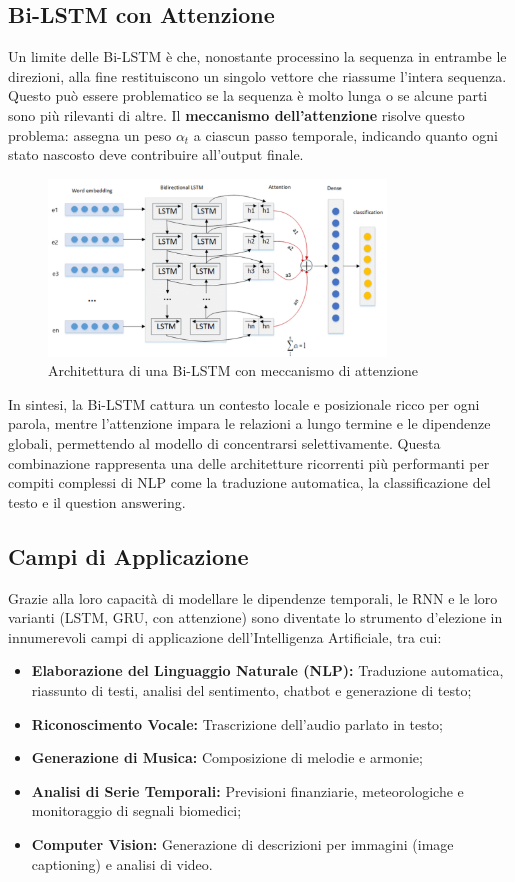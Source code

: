 \subsection{Bi-LSTM con Attenzione}
Un limite delle Bi-LSTM è che, nonostante processino la sequenza in entrambe le direzioni, alla fine restituiscono un singolo vettore che riassume l'intera sequenza. Questo può essere problematico se la sequenza è molto lunga o se alcune parti sono più rilevanti di altre. Il \textbf{meccanismo dell'attenzione} risolve questo problema: assegna un peso $\alpha_t$ a ciascun passo temporale, indicando quanto ogni stato nascosto deve contribuire all'output finale.

\begin{figure}[hbtp]
    \centering
    \includegraphics[width=0.8\textwidth]{figure/Bi-LSTMAtt.png}
    \caption{Architettura di una Bi-LSTM con meccanismo di attenzione}
    \label{fig:bilstmatt}
\end{figure}

In sintesi, la Bi-LSTM cattura un contesto locale e posizionale ricco per ogni parola, mentre l'attenzione impara le relazioni a lungo termine e le dipendenze globali, permettendo al modello di concentrarsi selettivamente. Questa combinazione rappresenta una delle architetture ricorrenti più performanti per compiti complessi di NLP come la traduzione automatica, la classificazione del testo e il question answering.

\subsection{Campi di Applicazione}
Grazie alla loro capacità di modellare le dipendenze temporali, le RNN e le loro varianti (LSTM, GRU, con attenzione) sono diventate lo strumento d'elezione in innumerevoli campi di applicazione dell'Intelligenza Artificiale, tra cui:
\begin{itemize}
    \item \textbf{Elaborazione del Linguaggio Naturale (NLP):} Traduzione automatica, riassunto di testi, analisi del sentimento, chatbot e generazione di testo;
    \item \textbf{Riconoscimento Vocale:} Trascrizione dell'audio parlato in testo;
    \item \textbf{Generazione di Musica:} Composizione di melodie e armonie;
    \item \textbf{Analisi di Serie Temporali:} Previsioni finanziarie, meteorologiche e monitoraggio di segnali biomedici;
    \item \textbf{Computer Vision:} Generazione di descrizioni per immagini (image captioning) e analisi di video.
\end{itemize}